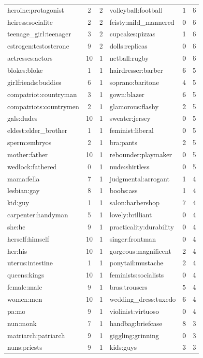 \documentclass{article}
\begin{document}
\begin{longtable}{l|c|c|l|c|c}
heroine:protagonist & 2 & 2 & volleyball:football & 1 &6 \\
heiress:socialite & 2 & 2 & feisty:mild\_mannered & 0 &6 \\
teenage\_girl:teenager & 3 & 2 & cupcakes:pizzas & 1 &6 \\
estrogen:testosterone & 9 & 2 & dolls:replicas & 0 &6 \\
actresses:actors & 10 & 1 & netball:rugby & 0 &6 \\
blokes:bloke & 1 & 1 & hairdresser:barber & 6 &5 \\
girlfriends:buddies & 6 & 1 & soprano:baritone & 4 &5 \\
compatriot:countryman & 3 & 1 & gown:blazer & 6 &5 \\
compatriots:countrymen & 2 & 1 & glamorous:flashy & 2 &5 \\
gals:dudes & 10 & 1 & sweater:jersey & 0 &5 \\
eldest:elder\_brother & 1 & 1 & feminist:liberal & 0 &5 \\
sperm:embryos & 2 & 1 & bra:pants & 2 &5 \\
mother:father & 10 & 1 & rebounder:playmaker & 0 &5 \\
wedlock:fathered & 0 & 1 & nude:shirtless & 0 &5 \\
mama:fella & 7 & 1 & judgmental:arrogant & 1 &4 \\
lesbian:gay & 8 & 1 & boobs:ass & 1 &4 \\
kid:guy & 1 & 1 & salon:barbershop & 7 &4 \\
carpenter:handyman & 5 & 1 & lovely:brilliant & 0 &4 \\
she:he & 9 & 1 & practicality:durability & 0 &4 \\
herself:himself & 10 & 1 & singer:frontman & 0 &4 \\
her:his & 10 & 1 & gorgeous:magnificent & 2 &4 \\
uterus:intestine & 1 & 1 & ponytail:mustache & 2 &4 \\
queens:kings & 10 & 1 & feminists:socialists & 0 &4 \\
female:male & 9 & 1 & bras:trousers & 5 &4 \\
women:men & 10 & 1 & wedding\_dress:tuxedo & 6 &4 \\
pa:mo & 9 & 1 & violinist:virtuoso & 0 &4 \\
nun:monk & 7 & 1 & handbag:briefcase & 8 &3 \\
matriarch:patriarch & 9 & 1 & giggling:grinning & 0 &3 \\
nuns:priests & 9 & 1 & kids:guys & 3 &3 \\

\end{longtable}
\end{document}
